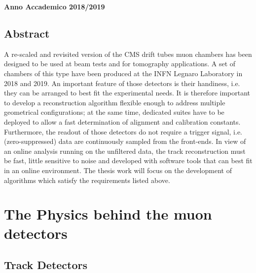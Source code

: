 \documentclass[a4paper,11pt]{book}
\begin{document}
\begin{titlepage}
\begin{center}
{\Large{\bf Anno Accademico 2018/2019}}
\end{center}
\end{titlepage}


\clearpage{\pagestyle{empty}\cleardoublepage}

\tableofcontents


\chapter*{Abstract}

A re-scaled and revisited version of the CMS drift tubes muon chambers has been designed to be used at beam tests and for
tomography applications. A set of chambers of this type have been produced at the INFN Legnaro Laboratory in 2018 and 2019. An
important feature of those detectors is their handiness, i.e. they can be arranged to best fit the experimental needs. It is therefore
important to develop a reconstruction algorithm flexible enough to address multiple geometrical configurations; at the same time,
dedicated suites have to be deployed to allow a fast determination of alignment and calibration constants. Furthermore, the readout
of those detectors do not require a trigger signal, i.e. (zero-suppressed) data are continuously sampled from the front-ends. In view
of an online analysis running on the unfiltered data, the track reconstruction must be fast, little sensitive to noise and developed with
software tools that can best fit in an online environment. The thesis work will focus on the development of algorithms which satisfy
the requirements listed above.




\part{The Physics behind the muon detectors}


\chapter{Track Detectors}
\end{document}
